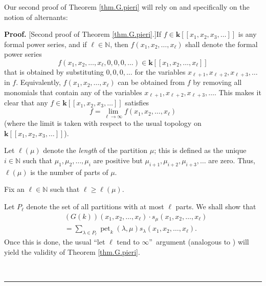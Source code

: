 \documentclass[numbers=enddot,12pt,final,onecolumn,notitlepage]{scrartcl}%
\theoremstyle{definition}
\newenvironment{proof}[1][Proof]{\noindent\textbf{#1.} }{\ \rule{0.5em}{0.5em}}
\let\sumnonlimits\sum
\renewcommand{\sum}{\sumnonlimits\limits}
\newenvironment{verlong}{}{}
\begin{document}
\begin{verlong}
Our second proof of Theorem \ref{thm.G.pieri} will rely on \cite[\S 2.6]%
{GriRei} and specifically on the notion of alternants:

\begin{proof}
[Second proof of Theorem \ref{thm.G.pieri}.]If $f\in\mathbf{k}\left[  \left[
x_{1},x_{2},x_{3},\ldots\right]  \right]  $ is any formal power series, and if
$\ell\in\mathbb{N}$, then $f\left(  x_{1},x_{2},\ldots,x_{\ell}\right)  $
shall denote the formal power series%
\[
f\left(  x_{1},x_{2},\ldots,x_{\ell},0,0,0,\ldots\right)  \in\mathbf{k}\left[
\left[  x_{1},x_{2},\ldots,x_{\ell}\right]  \right]
\]
that is obtained by substituting $0,0,0,\ldots$ for the variables $x_{\ell
+1},x_{\ell+2},x_{\ell+3},\ldots$ in $f$. Equivalently, $f\left(  x_{1}%
,x_{2},\ldots,x_{\ell}\right)  $ can be obtained from $f$ by removing all
monomials that contain any of the variables $x_{\ell+1},x_{\ell+2},x_{\ell
+3},\ldots$. This makes it clear that any $f\in\mathbf{k}\left[  \left[
x_{1},x_{2},x_{3},\ldots\right]  \right]  $ satisfies%
\begin{equation}
f=\lim\limits_{\ell\rightarrow\infty}f\left(  x_{1},x_{2},\ldots,x_{\ell
}\right)  \label{pf.thm.G.pieri.lim}%
\end{equation}
(where the limit is taken with respect to the usual topology on $\mathbf{k}%
\left[  \left[  x_{1},x_{2},x_{3},\ldots\right]  \right]  $).

Let $\ell\left(  \mu\right)  $ denote the \emph{length} of the partition $\mu
$; this is defined as the unique $i\in\mathbb{N}$ such that $\mu_{1},\mu
_{2},\ldots,\mu_{i}$ are positive but $\mu_{i+1},\mu_{i+2},\mu_{i+3},\ldots$
are zero. Thus, $\ell\left(  \mu\right)  $ is the number of parts of $\mu$.

Fix an $\ell\in\mathbb{N}$ such that $\ell\geq\ell\left(  \mu\right)  $.

Let $P_{\ell}$ denote the set of all partitions with at most $\ell$ parts. We
shall show that%
\begin{align}
&  \left(  G\left(  k\right)  \right)  \left(  x_{1},x_{2},\ldots,x_{\ell
}\right)  \cdot s_{\mu}\left(  x_{1},x_{2},\ldots,x_{\ell}\right) \nonumber\\
&  =\sum_{\lambda\in P_{\ell}}\operatorname*{pet}\nolimits_{k}\left(
\lambda,\mu\right)  s_{\lambda}\left(  x_{1},x_{2},\ldots,x_{\ell}\right)  .
\label{pf.thm.G.pieri.lvars}%
\end{align}
Once this is done, the usual \textquotedblleft let $\ell$ tend to $\infty
$\textquotedblright\ argument (analogous to \cite[proof of Corollary
2.6.11]{GriRei}) will yield the validity of Theorem \ref{thm.G.pieri}.


\end{proof}
\end{verlong}
\end{document}
